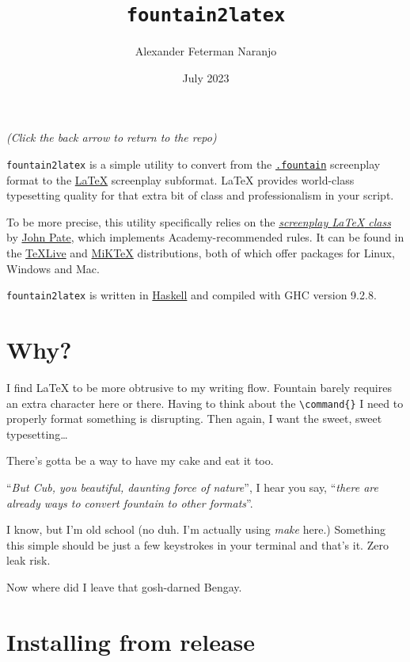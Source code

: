 \documentclass[11pt]{article}
\author{Alexander Feterman Naranjo}
\date{July 2023}
\title{\textbf{\texttt{fountain2latex}}}
\newcommand{\link}[2]{\textcolor{Blue}{\href{#1}{#2}}}
\begin{document}
\maketitle

\begin{center}
\scriptsize{\emph{(Click the back arrow to return to the repo)}}
\end{center}

\texttt{fountain2latex} is a simple utility to convert from the
\texttt{\link{https://fountain.io/}{.fountain}} screenplay format to
the \link{https://www.latex-project.org/}{\LaTeX} screenplay subformat.
{\LaTeX} provides world-class typesetting quality for that extra bit of
class and professionalism in your script.

To be more precise, this utility specifically relies on the
\emph{\link{https://www.ctan.org/pkg/screenplay}{screenplay {\LaTeX} class}}
by \link{http://dvc.org.uk/johnny.html}{John Pate}, which implements
Academy-recommended rules. It can be found in the
\link{https://tug.org/texlive/}{TeXLive} and
\link{https://miktex.org/}{MiKTeX} distributions, both of which offer
packages for Linux, Windows and Mac.

\texttt{fountain2latex} is written in \link{https://haskell.org}{Haskell}
and compiled with GHC version 9.2.8.


\section*{Why?}

I find {\LaTeX} to be more obtrusive to my writing flow. Fountain barely
requires an extra character here or there. Having to think about the
\verb|\command{}| I need to properly format something is disrupting.
Then again, I want the sweet, sweet typesetting{\ldots}

There's gotta be a way to have my cake and eat it too.

``\emph{But Cub, you beautiful, daunting force of nature}'', I hear you say,
``\emph{there are already ways to convert fountain to other formats}''.

I know, but I'm old school (no duh. I'm actually using \emph{make} here.)
Something this simple should be just a few keystrokes in your terminal and
that's it. Zero leak risk.

Now where did I leave that gosh-darned Bengay.


\section*{Installing from release}
\end{document}
